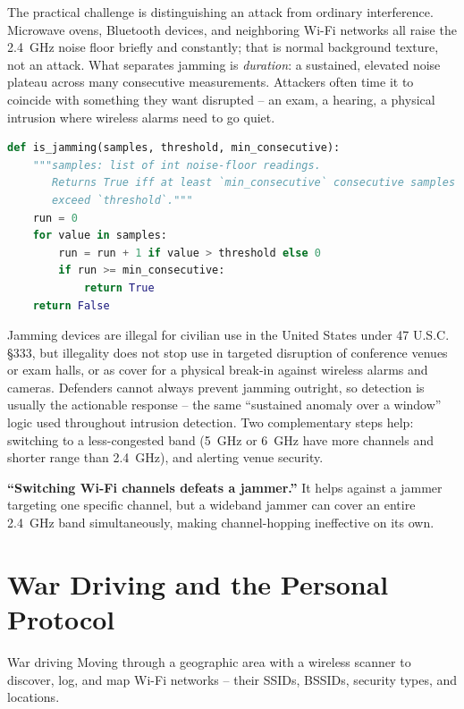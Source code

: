 The practical challenge is distinguishing an attack from ordinary interference. Microwave ovens,
Bluetooth devices, and neighboring Wi-Fi networks all raise the 2.4~GHz noise floor briefly and
constantly; that is normal background texture, not an attack. What separates jamming is
\emph{duration}: a sustained, elevated noise plateau across many consecutive measurements.
Attackers often time it to coincide with something they want disrupted -- an exam, a hearing, a
physical intrusion where wireless alarms need to go quiet.

\begin{lstlisting}[language=Python, caption={Detecting a sustained jamming event in a noise-floor sample series}]
def is_jamming(samples, threshold, min_consecutive):
    """samples: list of int noise-floor readings.
       Returns True iff at least `min_consecutive` consecutive samples
       exceed `threshold`."""
    run = 0
    for value in samples:
        run = run + 1 if value > threshold else 0
        if run >= min_consecutive:
            return True
    return False
\end{lstlisting}

Jamming devices are illegal for civilian use in the United States under 47 U.S.C. \S 333, but
illegality does not stop use in targeted disruption of conference venues or exam halls, or as
cover for a physical break-in against wireless alarms and cameras. Defenders cannot always
prevent jamming outright, so detection is usually the actionable response -- the same ``sustained
anomaly over a window'' logic used throughout intrusion detection. Two complementary steps help:
switching to a less-congested band (5~GHz or 6~GHz have more channels and shorter range than
2.4~GHz), and alerting venue security.

\begin{misconception}
\textbf{``Switching Wi-Fi channels defeats a jammer.''} It helps against a jammer targeting one
specific channel, but a wideband jammer can cover an entire 2.4~GHz band simultaneously,
making channel-hopping ineffective on its own.
\end{misconception}

\section{War Driving and the Personal Protocol}

\begin{definition}{War driving}
Moving through a geographic area with a wireless scanner to discover, log, and map Wi-Fi
networks -- their SSIDs, BSSIDs, security types, and locations.
\end{definition}

